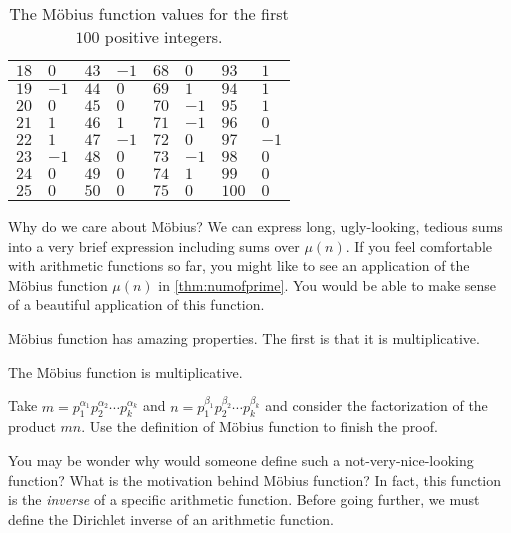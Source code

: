 \begin{example}
\begin{table}
\begin{tabular}{ | l | l | l | l | l | l | l | l | }
				$18$ & $0$   & $43$ & $-1$ & $68$ & $0$  & $93$  & $1$     \\ \hline
				$19$ & $-1$  & $44$ & $0$  & $69$ & $1$  & $94$  & $1$     \\ \hline
				$20$ & $0$   & $45$ & $0$  & $70$ & $-1$ & $95$  & $1$     \\ \hline
				$21$ & $1$   & $46$ & $1$  & $71$ & $-1$ & $96$  & $0$     \\ \hline
				$22$ & $1$   & $47$ & $-1$ & $72$ & $0$  & $97$  & $-1$    \\ \hline
				$23$ & $-1$  & $48$ & $0$  & $73$ & $-1$ & $98$  & $0$     \\ \hline
				$24$ & $0$   & $49$ & $0$  & $74$ & $1$  & $99$  & $0$     \\ \hline
				$25$ & $0$   & $50$ & $0$  & $75$ & $0$  & $100$ & $0$      \\ \hline
			\end{tabular}
			\caption{The M\"{o}bius function values for the first $100$ positive integers.}
			\label{table:mu(n)}
		\end{table}
	\end{example}

\begin{note}
	Why do we care about M\"{o}bius? We can express long, ugly-looking, tedious sums into a very brief expression including sums over $\mu(n)$. If you feel comfortable with arithmetic functions so far, you might like to see an application of the M\"{o}bius function $\mu(n)$ in \autoref{thm:numofprime}. You would be able to make sense of a beautiful application of this function.
\end{note}
	M\"{o}bius function has amazing properties. The first is that it is multiplicative.
	\begin{proposition}
		The M\"{o}bius function is multiplicative.
	\end{proposition}

	\begin{hint}
		Take $m=p_1^{\alpha_1}p_2^{\alpha_2} \cdots p_k^{\alpha_k}$ and $n=p_1^{\beta_1}p_2^{\beta_2} \cdots p_k^{\beta_k}$ and consider the factorization of the product $mn$. Use the definition of M\"{o}bius function to finish the proof.
	\end{hint}

You may be wonder why would someone define such a not-very-nice-looking function? What is the motivation behind M\"{o}bius function? In fact, this function is the \textit{inverse} of a specific arithmetic function. Before going further, we must define the Dirichlet inverse of an arithmetic function.

